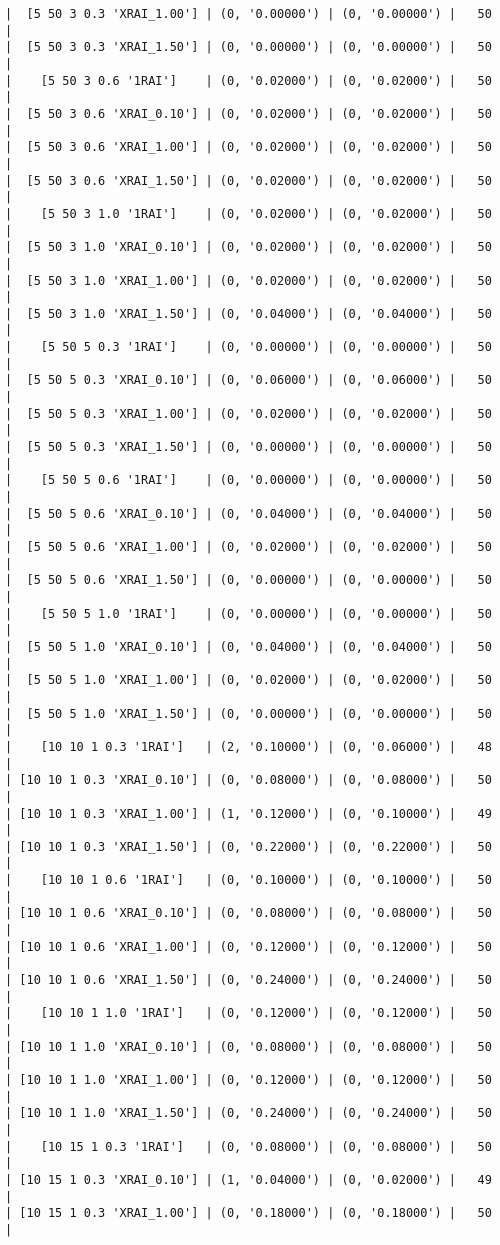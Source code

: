 \documentclass{article}
\begin{document}
\begin{verbatim}
|  [5 50 3 0.3 'XRAI_1.00'] | (0, '0.00000') | (0, '0.00000') |   50  |
|  [5 50 3 0.3 'XRAI_1.50'] | (0, '0.00000') | (0, '0.00000') |   50  |
|    [5 50 3 0.6 '1RAI']    | (0, '0.02000') | (0, '0.02000') |   50  |
|  [5 50 3 0.6 'XRAI_0.10'] | (0, '0.02000') | (0, '0.02000') |   50  |
|  [5 50 3 0.6 'XRAI_1.00'] | (0, '0.02000') | (0, '0.02000') |   50  |
|  [5 50 3 0.6 'XRAI_1.50'] | (0, '0.02000') | (0, '0.02000') |   50  |
|    [5 50 3 1.0 '1RAI']    | (0, '0.02000') | (0, '0.02000') |   50  |
|  [5 50 3 1.0 'XRAI_0.10'] | (0, '0.02000') | (0, '0.02000') |   50  |
|  [5 50 3 1.0 'XRAI_1.00'] | (0, '0.02000') | (0, '0.02000') |   50  |
|  [5 50 3 1.0 'XRAI_1.50'] | (0, '0.04000') | (0, '0.04000') |   50  |
|    [5 50 5 0.3 '1RAI']    | (0, '0.00000') | (0, '0.00000') |   50  |
|  [5 50 5 0.3 'XRAI_0.10'] | (0, '0.06000') | (0, '0.06000') |   50  |
|  [5 50 5 0.3 'XRAI_1.00'] | (0, '0.02000') | (0, '0.02000') |   50  |
|  [5 50 5 0.3 'XRAI_1.50'] | (0, '0.00000') | (0, '0.00000') |   50  |
|    [5 50 5 0.6 '1RAI']    | (0, '0.00000') | (0, '0.00000') |   50  |
|  [5 50 5 0.6 'XRAI_0.10'] | (0, '0.04000') | (0, '0.04000') |   50  |
|  [5 50 5 0.6 'XRAI_1.00'] | (0, '0.02000') | (0, '0.02000') |   50  |
|  [5 50 5 0.6 'XRAI_1.50'] | (0, '0.00000') | (0, '0.00000') |   50  |
|    [5 50 5 1.0 '1RAI']    | (0, '0.00000') | (0, '0.00000') |   50  |
|  [5 50 5 1.0 'XRAI_0.10'] | (0, '0.04000') | (0, '0.04000') |   50  |
|  [5 50 5 1.0 'XRAI_1.00'] | (0, '0.02000') | (0, '0.02000') |   50  |
|  [5 50 5 1.0 'XRAI_1.50'] | (0, '0.00000') | (0, '0.00000') |   50  |
|    [10 10 1 0.3 '1RAI']   | (2, '0.10000') | (0, '0.06000') |   48  |
| [10 10 1 0.3 'XRAI_0.10'] | (0, '0.08000') | (0, '0.08000') |   50  |
| [10 10 1 0.3 'XRAI_1.00'] | (1, '0.12000') | (0, '0.10000') |   49  |
| [10 10 1 0.3 'XRAI_1.50'] | (0, '0.22000') | (0, '0.22000') |   50  |
|    [10 10 1 0.6 '1RAI']   | (0, '0.10000') | (0, '0.10000') |   50  |
| [10 10 1 0.6 'XRAI_0.10'] | (0, '0.08000') | (0, '0.08000') |   50  |
| [10 10 1 0.6 'XRAI_1.00'] | (0, '0.12000') | (0, '0.12000') |   50  |
| [10 10 1 0.6 'XRAI_1.50'] | (0, '0.24000') | (0, '0.24000') |   50  |
|    [10 10 1 1.0 '1RAI']   | (0, '0.12000') | (0, '0.12000') |   50  |
| [10 10 1 1.0 'XRAI_0.10'] | (0, '0.08000') | (0, '0.08000') |   50  |
| [10 10 1 1.0 'XRAI_1.00'] | (0, '0.12000') | (0, '0.12000') |   50  |
| [10 10 1 1.0 'XRAI_1.50'] | (0, '0.24000') | (0, '0.24000') |   50  |
|    [10 15 1 0.3 '1RAI']   | (0, '0.08000') | (0, '0.08000') |   50  |
| [10 15 1 0.3 'XRAI_0.10'] | (1, '0.04000') | (0, '0.02000') |   49  |
| [10 15 1 0.3 'XRAI_1.00'] | (0, '0.18000') | (0, '0.18000') |   50  |

\end{verbatim}
\end{document}
